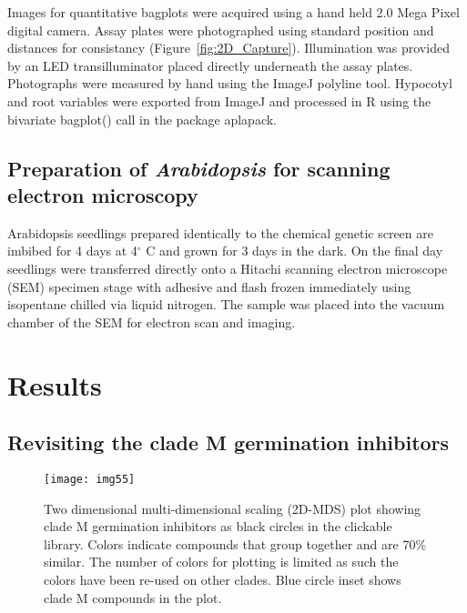 Images for quantitative bagplots were acquired using a hand held 2.0 Mega Pixel digital camera. Assay plates were photographed using standard position and distances for consistancy (Figure~\ref{fig:2D_Capture}). Illumination was provided by an LED transilluminator placed directly underneath the assay plates. Photographs were measured by hand using the ImageJ polyline tool. Hypocotyl and root variables were exported from ImageJ and processed in R using the bivariate bagplot() call in the package aplapack.



\subsection{Preparation of {\it Arabidopsis} for scanning electron microscopy}

Arabidopsis seedlings prepared identically to the chemical genetic screen are imbibed for 4 days at 4${}^\circ$ C and grown for 3 days in the dark. On the final day seedlings were transferred directly onto a Hitachi scanning electron microscope (SEM) specimen stage with adhesive and flash frozen immediately using isopentane chilled via liquid nitrogen. The sample was placed into the vacuum chamber of the SEM for electron scan and imaging. 

\clearpage

\section{Results}

\subsection{Revisiting the clade M germination inhibitors}

\begin{figure}
\centering
\texttt{[image: img55]}
\caption{Two dimensional multi-dimensional scaling (2D-MDS) plot showing clade M germination inhibitors as black circles in the clickable library. Colors indicate compounds that group together and are 70{\%} similar. The number of colors for plotting is limited as such the colors have been re-used on other clades. Blue circle inset shows clade M compounds in the plot.}
\label{fig:FAEs}
\end{figure}

